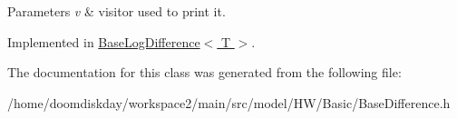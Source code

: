\begin{DoxyParams}{Parameters}
{\em v} & visitor used to print it. \\
\hline
\end{DoxyParams}


Implemented in \hyperlink{classBaseLogDifference_aedf247712392189dc236bd82e8fa8ea0}{Base\+Log\+Difference$<$ T $>$}.



The documentation for this class was generated from the following file\+:\begin{DoxyCompactItemize}
\item 
/home/doomdiskday/workspace2/main/src/model/\+H\+W/\+Basic/Base\+Difference.\+h\end{DoxyCompactItemize}
